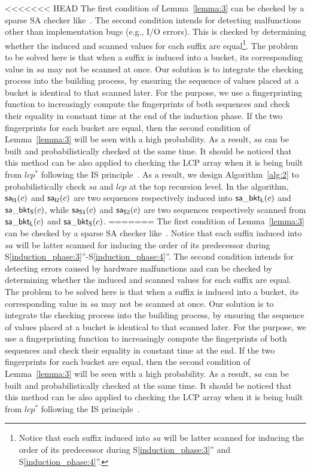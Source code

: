 \documentclass[10pt,journal,compsoc]{IEEEtran}
\begin{document}
<<<<<<< HEAD
The first condition of Lemma~\ref{lemma:3} can be checked by a sparse SA checker like~\cite{wu2017}. The second condition intends for detecting malfunctions other than implementation bugs (e.g., I/O errors). This is checked by determining whether the induced and scanned values for each suffix are equal\footnote{Notice that each suffix induced into $sa$ will be latter scanned for inducing the order of its predecessor during S\ref{induction_phase:3}'' and S\ref{induction_phase:4}''. }. The problem to be solved here is that when a suffix is induced into a bucket, its corresponding value in $sa$ may not be scanned at once. Our solution is to integrate the checking process into the building process, by ensuring the sequence of values placed at a bucket is identical to that scanned later. For the purpose, we use a fingerprinting function to increasingly compute the fingerprints of both sequences and check their equality in constant time at the end of the induction phase. If the two fingerprints for each bucket are equal, then the second condition of Lemma~\ref{lemma:3} will be seen with a high probability. As a result, $sa$ can be built and probabilistically checked at the same time. It should be noticed that this method can be also applied to checking the LCP array when it is being built from $lcp^*$ following the IS principle~\cite{Fischer11}. As a result, we design Algorithm~\ref{alg:2} to probabilistically check $sa$ and $lcp$ at the top recursion level. In the algorithm, ${\sf sa_{I1}}(c)$ and ${\sf sa_{I2}}(c)$ are two sequences respectively induced into ${\sf sa\_bkt_L}(c)$ and ${\sf sa\_bkt_S}(c)$, while ${\sf sa_{S1}}(c)$ and ${\sf sa_{S2}}(c)$ are two sequences respectively scanned from ${\sf sa\_bkt_L}(c)$ and ${\sf sa\_bkt_S}(c)$. 
=======
The first condition of Lemma~\ref{lemma:3} can be checked by a sparse SA checker like~\cite{wu2017}. Notice that each suffix induced into $sa$ will be latter scanned for inducing the order of its predecessor during S\ref{induction_phase:3}''-S\ref{induction_phase:4}''. The second condition intends for detecting errors caused by hardware malfunctions and can be checked by determining whether the induced and scanned values for each suffix are equal. The problem to be solved here is that when a suffix is induced into a bucket, its corresponding value in $sa$ may not be scanned at once. Our solution is to integrate the checking process into the building process, by ensuring the sequence of values placed at a bucket is identical to that scanned later. For the purpose, we use a fingerprinting function to increasingly compute the fingerprints of both sequences and check their equality in constant time at the end. If the two fingerprints for each bucket are equal, then the second condition of Lemma~\ref{lemma:3} will be seen with a high probability. As a result, $sa$ can be built and probabilistically checked at the same time. It should be noticed that this method can be also applied to checking the LCP array when it is being built from $lcp^*$ following the IS principle~\cite{Fischer11}. 
\end{document}
